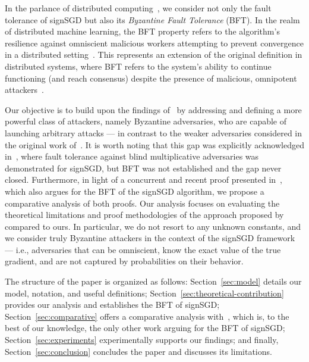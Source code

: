 In the parlance of distributed computing~\cite{lamport}, we consider not only the fault tolerance of signSGD but also its \emph{Byzantine Fault Tolerance} (BFT). In the realm of distributed machine learning, the BFT property refers to the algorithm's resilience against omniscient malicious workers attempting to prevent convergence in a distributed setting~\cite{blanchard2017machine, alistarh2018byzantine, mhamdi2018hidden, bernstein2018signsgd}. This represents an extension of the original definition in distributed systems, where BFT refers to the system's ability to continue functioning (and reach consensus) despite the presence of malicious, omnipotent attackers~\cite{lamport, castro1999practical}.

Our objective is to build upon the findings of~\cite{bernstein2018signsgd} by addressing and defining a more powerful class of attackers, namely Byzantine adversaries, who are capable of launching arbitrary attacks — in contrast to the weaker adversaries considered in the original work of~\cite{bernstein2018signsgd}. It is worth noting that this gap was explicitly acknowledged in~\cite{bernstein2018signsgd}, where fault tolerance against blind multiplicative adversaries was demonstrated for signSGD, but BFT was not established and the gap never closed. Furthermore, in light of a concurrent and recent proof presented in~\cite{jin2024sign}, which also argues for the BFT of the signSGD algorithm, we propose a comparative analysis of both proofs. Our analysis focuses on evaluating the theoretical limitations and proof methodologies of the approach proposed by~\cite{jin2024sign} compared to ours. In particular, we do not resort to any unknown constants, and we consider truly Byzantine attackers in the context of the signSGD framework — i.e., adversaries that can be omniscient, know the exact value of the true gradient, and are not captured by probabilities on their behavior.

The structure of the paper is organized as follows: Section~\ref{sec:model} details our model, notation, and useful definitions; Section~\ref{sec:theoretical-contribution} provides our analysis and establishes the BFT of signSGD; Section~\ref{sec:comparative} offers a comparative analysis with~\cite{jin2024sign}, which is, to the best of our knowledge, the only other work arguing for the BFT of signSGD; Section~\ref{sec:experiments} experimentally supports our findings; and finally, Section~\ref{sec:conclusion} concludes the paper and discusses its limitations.